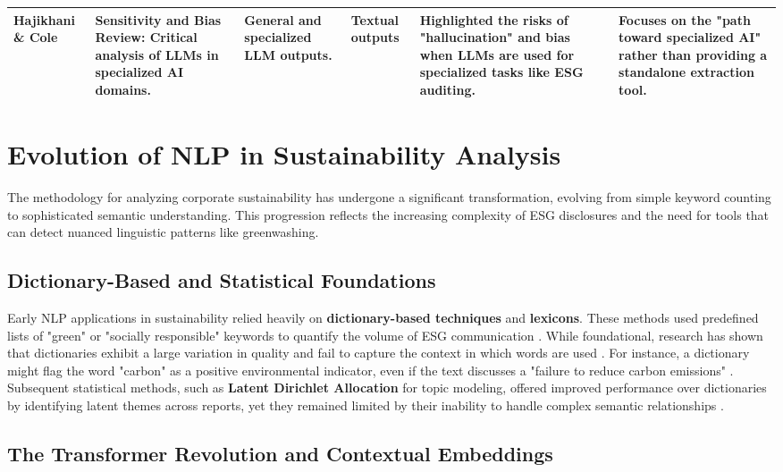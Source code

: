 \documentclass[english, online, cse, master]{dithesis}
\begin{document}
\begin{landscape}
\begin{table}[p]
\begin{tabularx}{\linewidth}{|p{1.8cm}|X|X|p{1.8cm}|X|X|}
\textbf{Hajikhani \& Cole}  \parencite{arash_hajikhani_cbb2528f} & \textbf{Sensitivity and Bias Review}: Critical analysis of LLMs in specialized AI domains. & General and specialized LLM outputs. & Textual outputs & Highlighted the risks of "hallucination" and bias when LLMs are used for specialized tasks like ESG auditing. & Focuses on the "path toward specialized AI" rather than providing a standalone extraction tool. \\ \hline
\end{tabularx}
\end{table}
\end{landscape}
\section{ Evolution of NLP in Sustainability Analysis}

The methodology for analyzing corporate sustainability has undergone a significant transformation, evolving from simple keyword counting to sophisticated semantic understanding. This progression reflects the increasing complexity of ESG disclosures and the need for tools that can detect nuanced linguistic patterns like greenwashing.
\subsection{Dictionary-Based and Statistical Foundations}

Early NLP applications in sustainability relied heavily on \textbf{dictionary-based techniques} and \textbf{lexicons}. These methods used predefined lists of "green" or "socially responsible" keywords to quantify the volume of ESG communication  \parencite{frederik_maibaum_b8629037}. While foundational, research has shown that dictionaries exhibit a large variation in quality and fail to capture the context in which words are used  \parencite{frederik_maibaum_b8629037}. For instance, a dictionary might flag the word "carbon" as a positive environmental indicator, even if the text discusses a "failure to reduce carbon emissions"  \parencite{julia_bingler_268445e3}. Subsequent statistical methods, such as \textbf{Latent Dirichlet Allocation} for topic modeling, offered improved performance over dictionaries by identifying latent themes across reports, yet they remained limited by their inability to handle complex semantic relationships  \parencite{frederik_maibaum_b8629037}.
\subsection{The Transformer Revolution and Contextual Embeddings}
\end{document}
